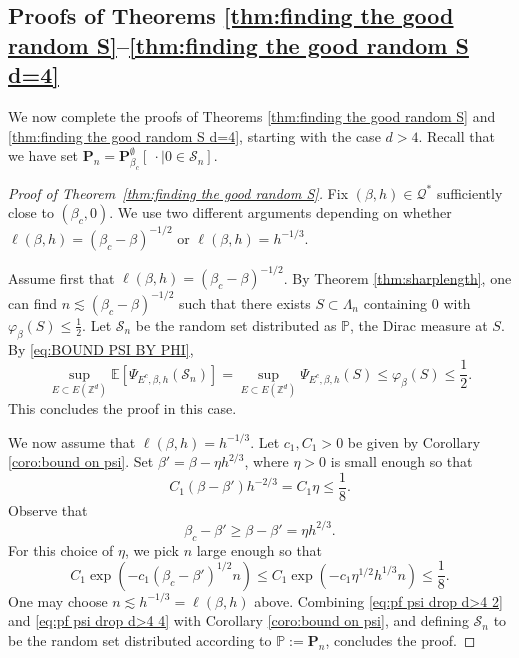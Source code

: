 \documentclass[10pt,a4paper]{amsart}
\numberwithin{equation}{section}
\begin{document}
\subsection{Proofs of Theorems \ref{thm:finding the good random S}--\ref{thm:finding the good random S d=4}}


We now complete the proofs of Theorems \ref{thm:finding the good random S} and \ref{thm:finding the good random S d=4}, starting with the case $d>4$. Recall that we have set $\mathbf P_n=\mathbf P_{\beta_c}^\emptyset[\: \cdot\mid 0\in \mathcal S_n]$.
\begin{proof}[Proof of Theorem~\textup{\ref{thm:finding the good random S}}] Fix $(\beta,h)\in \mathcal Q^*$ sufficiently close to $(\beta_c,0)$. We use two different arguments depending on whether $\ell(\beta,h)=(\beta_c-\beta)^{-1/2}$ or $\ell(\beta,h)=h^{-1/3}$. 

 Assume first that $\ell(\beta,h)=(\beta_c-\beta)^{-1/2}$. By Theorem \ref{thm:sharplength}, one can find $n\lesssim (\beta_c-\beta)^{-1/2}$ such that there exists $S\subset \Lambda_n$ containing $0$ with $\varphi_{\beta}(S)\leq \tfrac{1}{2}$. Let $\mathcal S_n$ be the random set distributed as $\mathbb P$, the Dirac measure at $S$. By \eqref{eq:BOUND PSI BY PHI},
\begin{equation}
	\sup_{E\subset E(\mathbb Z^d)}\mathbb E[\Psi_{E^c,\beta,h}(\mathcal S_n)]=\sup_{E\subset E(\mathbb Z^d)}\Psi_{E^c,\beta,h}(S)\leq \varphi_{\beta}(S)\leq \frac{1}{2}.
\end{equation}
This concludes the proof in this case.

We now assume that $\ell(\beta,h)=h^{-1/3}$. Let $c_1,C_1>0$ be given by Corollary \ref{coro:bound on psi}. Set $\beta'=\beta-\eta h^{2/3}$, where $\eta>0$ is small enough so that
\begin{equation}\label{eq:pf psi drop d>4 2}
	C_1(\beta-\beta')h^{-2/3}= C_1\eta\leq \frac{1}{8}.
\end{equation}
Observe that 
\begin{equation}\label{eq:pf psi drop d>4 3}
	\beta_c-\beta'\geq \beta-\beta'= \eta h^{2/3}.\end{equation}
For this choice of $\eta$,  we pick $n$ large enough so that
\begin{equation}\label{eq:pf psi drop d>4 4}
	C_1\exp(-c_1(\beta_c-\beta')^{1/2}n)\leq C_1\exp(-c_1\eta^{1/2}h^{1/3}n)\leq \frac{1}{8}.
\end{equation}
One may choose $n\lesssim h^{-1/3}=\ell(\beta,h)$ above. Combining \eqref{eq:pf psi drop d>4 2} and \eqref{eq:pf psi drop d>4 4} with Corollary \ref{coro:bound on psi}, and defining $\mathcal S_n$ to be the random set distributed according to $\mathbb P:=\mathbf P_n$, concludes the proof.
\end{proof}
\end{document}
